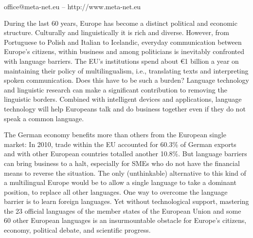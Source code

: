 \vfill
\centerline{office@meta-net.eu -- http://www.meta-net.eu}


\setcounter{section}{0}
\setcounter{figure}{0}

\cleardoublepage



\begin{multicols}{2}

During the last 60 years, Europe has become a distinct political and economic structure. Culturally and linguistically it is rich and diverse. However, from Portuguese to Polish and Italian to Icelandic, everyday communication between Europe’s citizens, within business and among politicians is inevitably confronted with language barriers. The EU's institutions spend about €1 billion a year on maintaining their policy of multilingualism, i.e., translating texts and interpreting spoken communication. Does this have to be such a burden? Language technology and linguistic research can make a significant contribution to removing the linguistic borders. Combined with intelligent devices and applications, language technology will help Europeans talk and do business together even if they do not speak a common language. 


The German economy benefits more than others from the European single market: In 2010, trade within the EU accounted for 60.3\% of German exports and with other European countries totalled another 10.8\%. But language barriers can bring business to a halt, especially for SMEs who do not have the financial means to reverse the situation. The only (unthinkable) alternative to this kind of a multilingual Europe would be to allow a single language to take a dominant position, to replace all other languages. 
One way to overcome the language barrier is to learn foreign languages. Yet without technological support, mastering the 23 official languages of the member states of the European Union and some 60 other European languages is an insurmountable obstacle for Europe’s citizens, economy, political debate, and scientific progress. 


\end{multicols}
